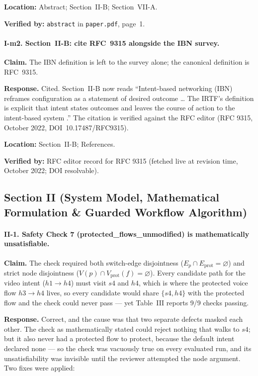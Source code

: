 \documentclass[11pt,a4paper]{article}
\begin{document}
\textbf{Location:} Abstract; Section~II-B; Section~VII-A.

\textbf{Verified by:} \texttt{abstract} in \texttt{paper.pdf}, page~1.

\paragraph{I-m2. Section~II-B: cite RFC~9315 alongside the IBN survey.}

\textbf{Claim.} The IBN definition is left to the survey alone; the canonical
definition is RFC~9315.

\textbf{Response.} Cited. Section~II-B now reads ``Intent-based networking (IBN)
reframes configuration as a statement of desired outcome \ldots{} The IRTF's
definition is explicit that intent states outcomes and leaves the course of
action to the intent-based system \cite{rfc9315}.'' The citation is verified
against the RFC editor (RFC 9315, October 2022, DOI~10.17487/RFC9315).

\textbf{Location:} Section~II-B; References.

\textbf{Verified by:} RFC editor record for RFC 9315 (fetched live at
revision time, October 2022; DOI resolvable).

\subsection{Section II (System Model, Mathematical Formulation \& Guarded Workflow Algorithm)}

\paragraph{II-1. Safety Check 7 (protected\_flows\_unmodified) is mathematically
unsatisfiable.}

\textbf{Claim.} The check required both switch-edge disjointness
($E_p \cap E_{\mathrm{prot}} = \varnothing$) and strict node disjointness
($V(p) \cap V_{\mathrm{prot}}(f) = \varnothing$). Every candidate path for the
video intent ($h1\!\to\!h4$) must visit $s4$ and $h4$, which is where the
protected voice flow $h3\!\to\!h4$ lives, so every candidate would share
$\{s4, h4\}$ with the protected flow and the check could never pass ---
yet Table~III reports 9/9 checks passing.

\textbf{Response.} Correct, and the cause was that two separate defects masked
each other. The check as mathematically stated could reject nothing that walks
to $s4$; but it also never had a protected flow to protect, because the default
intent declared none --- so the check was vacuously true on every evaluated run,
and its unsatisfiability was invisible until the reviewer attempted the node
argument. Two fixes were applied:
\end{document}

